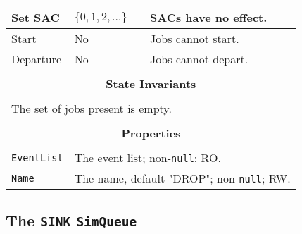 \documentclass[12pt]{book}
\begin{document}
\begin{tabular}{|l|l|l|}
\hline
Set SAC & $\{0, 1, 2, \ldots\}$ & SACs have no effect. \\
\hline
Start & No & Jobs cannot start. \\
\hline
Departure & No & Jobs cannot depart. \\
\hline
\multicolumn{3}{|c|}{} \\
\multicolumn{3}{|c|}{\bf State  Invariants} \\
\multicolumn{3}{|c|}{} \\
\hline
\multicolumn{3}{|l|}{The set of jobs present is empty.} \\
\hline
\multicolumn{3}{|c|}{} \\
\multicolumn{3}{|c|}{\bf Properties} \\
\multicolumn{3}{|c|}{} \\
\hline
\lstinline|EventList| & \multicolumn{2}{|l|}{The event list; non-\lstinline|null|; RO.} \\
\hline
\lstinline|Name|      & \multicolumn{2}{|l|}{The name, default "DROP"; non-\lstinline|null|; RW.} \\
\hline
\end{tabular}

\subsection{The \lstinline{SINK} \lstinline{SimQueue}}
\end{document}
